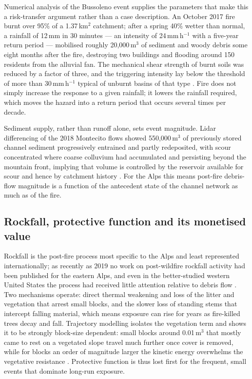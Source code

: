 \documentclass[11pt,a4paper]{article}
\begin{document}
Numerical analysis of the Bussoleno event supplies the parameters that make this a risk-transfer argument rather than a case description. An October 2017 fire burnt over 95\% of a 1.37\,km$^2$ catchment; after a spring 40\% wetter than normal, a rainfall of 12\,mm in 30 minutes --- an intensity of 24\,mm\,h$^{-1}$ with a five-year return period --- mobilised roughly 20{,}000\,m$^3$ of sediment and woody debris some eight months after the fire, destroying two buildings and flooding around 150 residents from the alluvial fan. The mechanical shear strength of burnt soils was reduced by a factor of three, and the triggering intensity lay below the threshold of more than 30\,mm\,h$^{-1}$ typical of unburnt basins of that type \citep{laporta_postwildfire_2025}. Fire does not simply increase the response to a given rainfall; it lowers the rainfall required, which moves the hazard into a return period that occurs several times per decade.

Sediment supply, rather than runoff alone, sets event magnitude. Lidar differencing of the 2018 Montecito flows showed 550{,}000\,m$^3$ of previously stored channel sediment progressively entrained and partly redeposited, with scour concentrated where coarse colluvium had accumulated and persisting beyond the mountain front, implying that volume is controlled by the reservoir available for scour and hence by catchment history \citep{morell_sediment_2021}. For the Alps this means post-fire debris-flow magnitude is a function of the antecedent state of the channel network as much as of the fire.

\subsection{Rockfall, protective function and its monetised value}

Rockfall is the post-fire process most specific to the Alps and least represented internationally; as recently as 2019 no work on post-wildfire rockfall activity had been published for the eastern Alps, and even in the better-studied western United States the process had received little attention relative to debris flow \citep{melzner_brief_2019}. Two mechanisms operate: direct thermal weakening and loss of the litter and vegetation that arrest small blocks, and the slower loss of standing stems that intercept falling material, which means exposure can rise for years as fire-killed trees decay and fall. Trajectory modelling isolates the vegetation term and shows it to be strongly block-size dependent: small blocks around 0.01\,m$^3$ that mostly came to rest on a vegetated slope travel much further once cover is removed, while for blocks an order of magnitude larger the kinetic energy overwhelms the vegetative resistance \citep{asteriou_assessing_2025}. Protective function is thus lost first for the frequent, small events that dominate long-run exposure.
\end{document}

